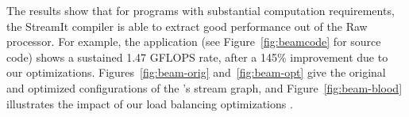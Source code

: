 The results show that for programs with substantial computation
requirements, the StreamIt compiler is able to extract good
performance out of the Raw processor.  For example, the \BeamFormer
application (see Figure~\ref{fig:beamcode} for source code) shows a
sustained 1.47 GFLOPS rate, after a 145\% improvement due to our
optimizations.  Figures~\ref{fig:beam-orig} and~\ref{fig:beam-opt}
give the original and optimized configurations of the \BeamFormer's
stream graph, and Figure~\ref{fig:beam-blood} illustrates the impact
of our load balancing optimizations .
%

